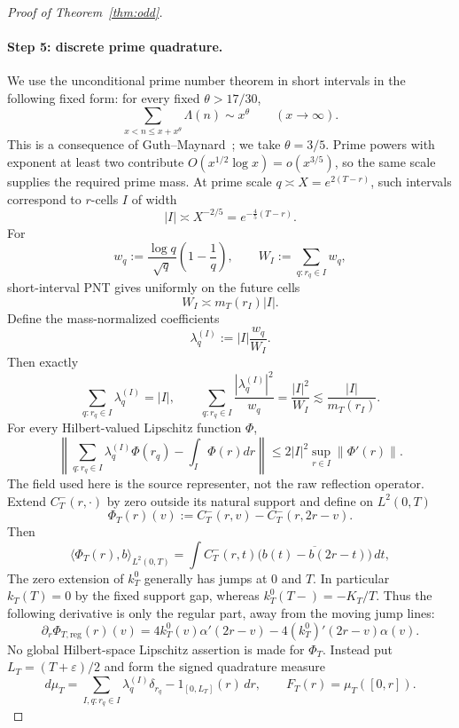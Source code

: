 \begin{proof}[Proof of Theorem~\ref{thm:odd}]
\paragraph{Step 5: discrete prime quadrature.}
We use the unconditional prime number theorem in short intervals in the following
fixed form: for every fixed $\theta>17/30$,
\[
 \sum_{x<n\le x+x^\theta}\Lambda(n)\sim x^\theta
 \qquad(x\to\infty).
\tag{6.18}\label{eq:short-PNT}
\]
This is a consequence of Guth--Maynard~\cite{GuthMaynard2026}; we take
$\theta=3/5$.  Prime powers with exponent at least two contribute
$O(x^{1/2}\log x)=o(x^{3/5})$, so the same scale supplies the required prime mass.
At prime scale $q\asymp X=e^{2(T-r)}$, such intervals correspond to $r$-cells $I$ of
width
\[
 |I|\asymp X^{-2/5}=e^{-\frac45(T-r)}.
\]
For
\[
 w_q:=\frac{\log q}{\sqrt q}\left(1-\frac1q\right),
 \qquad
 W_I:=\sum_{q:r_q\in I}w_q,
\]
short-interval PNT gives uniformly on the future cells
\[
 \boxed{W_I\asymp m_T(r_I)|I|.}
\tag{6.19}\label{eq:prime-cell-mass}
\]
Define the mass-normalized coefficients
\[
 \lambda_q^{(I)}:=|I|\frac{w_q}{W_I}.
\]
Then exactly
\[
 \sum_{q:r_q\in I}\lambda_q^{(I)}=|I|,
 \qquad
 \sum_{q:r_q\in I}\frac{|\lambda_q^{(I)}|^2}{w_q}
 =\frac{|I|^2}{W_I}
 \lesssim\frac{|I|}{m_T(r_I)}.
\tag{6.20}\label{eq:prime-cell-cost}
\]
For every Hilbert-valued Lipschitz function $\Phi$,
\[
 \left\|\sum_{q:r_q\in I}\lambda_q^{(I)}\Phi(r_q)
 -\int_I\Phi(r)dr\right\|
 \le2|I|^2\sup_{r\in I}\|\Phi'(r)\|.
\tag{6.21}\label{eq:prime-cell-quadrature}
\]
The field used here is the source representer, not the raw reflection operator.  Extend
$C_T^-(r,\cdot)$ by zero outside its natural support and define on $L^2(0,T)$
\[
 \boxed{\Phi_T(r)(v):=C_T^-(r,v)-C_T^-(r,2r-v).}
\tag{6.21a}\label{eq:odd-source-representer}
\]
Then
\[
 \langle\Phi_T(r),b\rangle_{L^2(0,T)}
 =\int C_T^-(r,t)\overline{\bigl(b(t)-b(2r-t)\bigr)}\,dt,
\tag{6.21b}\label{eq:odd-source-representer-pairing}
\]
The zero extension of $k_T^0$ generally has jumps at $0$ and $T$.
In particular $k_T(T)=0$ by the fixed support gap, whereas
$k_T^0(T-)=-K_T/T$.  Thus the following derivative is only the
regular part, away from the moving jump lines:
\[
 \boxed{\partial_r\Phi_{T,\mathrm{reg}}(r)(v)
 =4k_T^0(v)\alpha'(2r-v)-4(k_T^0)'(2r-v)\alpha(v).}
\tag{6.21c}\label{eq:odd-source-representer-derivative}
\]
No global Hilbert-space Lipschitz assertion is made for $\Phi_T$.
Instead put $L_T=(T+\varepsilon)/2$ and form the signed quadrature measure
\[
 d\mu_T=\sum_{I,q:r_q\in I}\lambda_q^{(I)}\delta_{r_q}
       -1_{[0,L_T]}(r)\,dr,\qquad
 F_T(r)=\mu_T([0,r]).
\]
\end{proof}
